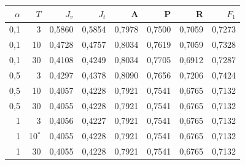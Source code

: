 \setlength{\tabcolsep}{4pt}
\begin{tabular}{rrrrrrrr}
\toprule
$\alpha$ & $T$ & $J_v$ & $J_t$ & A & P & R & $F_1$ \\
\midrule
0{,}1 & 3 & 0{,}5860 & 0{,}5854 & 0{,}7978 & 0{,}7500 & 0{,}7059 & 0{,}7273 \\
0{,}1 & 10 & 0{,}4728 & 0{,}4757 & 0{,}8034 & 0{,}7619 & 0{,}7059 & 0{,}7328 \\
0{,}1 & 30 & 0{,}4108 & 0{,}4249 & 0{,}8034 & 0{,}7705 & 0{,}6912 & 0{,}7287 \\
0{,}5 & 3 & 0{,}4297 & 0{,}4378 & 0{,}8090 & 0{,}7656 & 0{,}7206 & 0{,}7424 \\
0{,}5 & 10 & 0{,}4057 & 0{,}4228 & 0{,}7921 & 0{,}7541 & 0{,}6765 & 0{,}7132 \\
0{,}5 & 30 & 0{,}4055 & 0{,}4228 & 0{,}7921 & 0{,}7541 & 0{,}6765 & 0{,}7132 \\
1 & 3 & 0{,}4056 & 0{,}4227 & 0{,}7921 & 0{,}7541 & 0{,}6765 & 0{,}7132 \\
1 & 10$^*$ & 0{,}4055 & 0{,}4228 & 0{,}7921 & 0{,}7541 & 0{,}6765 & 0{,}7132 \\
1 & 30 & 0{,}4055 & 0{,}4228 & 0{,}7921 & 0{,}7541 & 0{,}6765 & 0{,}7132 \\
\bottomrule
\end{tabular}
